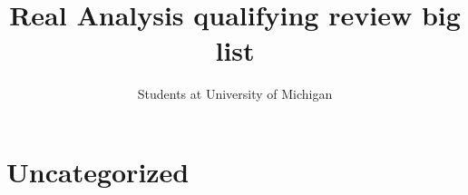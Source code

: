\documentclass[11pt, notitlepage]{article}
\title{Real Analysis qualifying review big list}
\author{Students at University of Michigan}
\theoremstyle{definition}
\theoremstyle{definition}
\theoremstyle{definition}
\theoremstyle{remark}
\begin{document}
\maketitle

\tableofcontents

\section{Uncategorized}
\label{sec:uncategorized}
\end{document}
